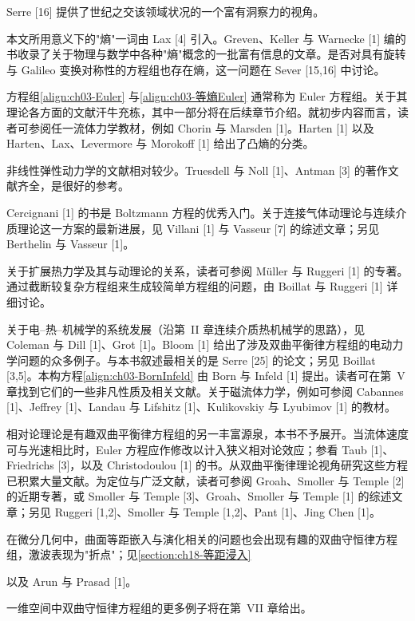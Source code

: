 \documentclass[../../main.tex]{subfiles}
\begin{document}
Serre [16] 提供了世纪之交该领域状况的一个富有洞察力的视角。

本文所用意义下的"熵"一词由 Lax [4] 引入。Greven、Keller 与 Warnecke [1] 编的书收录了关于物理与数学中各种"熵"概念的一批富有信息的文章。是否对具有旋转与 Galileo 变换对称性的方程组也存在熵，这一问题在 Sever [15,16] 中讨论。

方程组\eqref{align:ch03-Euler} 与\eqref{align:ch03-等熵Euler} 通常称为 Euler 方程组。关于其理论各方面的文献汗牛充栋，其中一部分将在后续章节介绍。就初步内容而言，读者可参阅任一流体力学教材，例如 Chorin 与 Marsden [1]。Harten [1] 以及 Harten、Lax、Levermore 与 Morokoff [1] 给出了凸熵的分类。

非线性弹性动力学的文献相对较少。Truesdell 与 Noll [1]、Antman [3] 的著作文献齐全，是很好的参考。

Cercignani [1] 的书是 Boltzmann 方程的优秀入门。关于连接气体动理论与连续介质理论这一方案的最新进展，见 Villani [1] 与 Vasseur [7] 的综述文章；另见 Berthelin 与 Vasseur [1]。

关于扩展热力学及其与动理论的关系，读者可参阅 Müller 与 Ruggeri [1] 的专著。通过截断较复杂方程组来生成较简单方程组的问题，由 Boillat 与 Ruggeri [1] 详细讨论。

关于电--热--机械学的系统发展（沿第~II 章连续介质热机械学的思路），见 Coleman 与 Dill [1]、Grot [1]。Bloom [1] 给出了涉及双曲平衡律方程组的电动力学问题的众多例子。与本书叙述最相关的是 Serre [25] 的论文；另见 Boillat [3,5]。本构方程\eqref{align:ch03-BornInfeld} 由 Born 与 Infeld [1] 提出。读者可在第~V 章找到它们的一些非凡性质及相关文献。关于磁流体力学，例如可参阅 Cabannes [1]、Jeffrey [1]、Landau 与 Lifshitz [1]、Kulikovskiy 与 Lyubimov [1] 的教材。

相对论理论是有趣双曲平衡律方程组的另一丰富源泉，本书不予展开。当流体速度可与光速相比时，Euler 方程应作修改以计入狭义相对论效应；参看 Taub [1]、Friedrichs [3]，以及 Christodoulou [1] 的书。从双曲平衡律理论视角研究这些方程已积累大量文献。为定位与广泛文献，读者可参阅 Groah、Smoller 与 Temple [2] 的近期专著，或 Smoller 与 Temple [3]、Groah、Smoller 与 Temple [1] 的综述文章；另见 Ruggeri [1,2]、Smoller 与 Temple [1,2]、Pant [1]、Jing Chen [1]。

在微分几何中，曲面等距嵌入与演化相关的问题也会出现有趣的双曲守恒律方程组，激波表现为"折点"；见\cref{section:ch18-等距浸入}%

以及 Arun 与 Prasad [1]。

一维空间中双曲守恒律方程组的更多例子将在第~VII 章给出。
\end{document}
